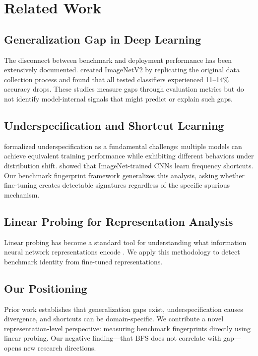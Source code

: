 \section{Related Work}
\label{sec:related}

\subsection{Generalization Gap in Deep Learning}

The disconnect between benchmark and deployment performance has been extensively documented. \citet{recht2019imagenet} created ImageNetV2 by replicating the original data collection process and found that all tested classifiers experienced 11--14\% accuracy drops. These studies measure gaps through evaluation metrics but do not identify model-internal signals that might predict or explain such gaps.

\subsection{Underspecification and Shortcut Learning}

\citet{damour2020underspecification} formalized underspecification as a fundamental challenge: multiple models can achieve equivalent training performance while exhibiting different behaviors under distribution shift. \citet{wang2025imagenet} showed that ImageNet-trained CNNs learn frequency shortcuts. Our benchmark fingerprint framework generalizes this analysis, asking whether fine-tuning creates detectable signatures regardless of the specific spurious mechanism.

\subsection{Linear Probing for Representation Analysis}

Linear probing has become a standard tool for understanding what information neural network representations encode \citep{alain2017understanding,kornblith2019better}. We apply this methodology to detect benchmark identity from fine-tuned representations.

\subsection{Our Positioning}

Prior work establishes that generalization gaps exist, underspecification causes divergence, and shortcuts can be domain-specific. We contribute a novel representation-level perspective: measuring benchmark fingerprints directly using linear probing. Our negative finding---that BFS does not correlate with gap---opens new research directions.
